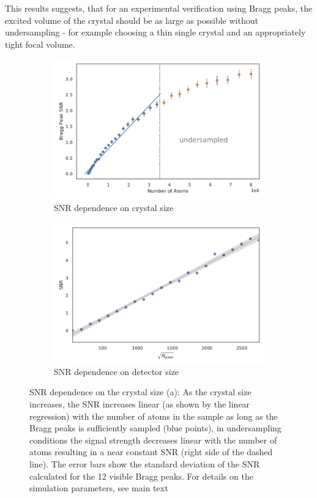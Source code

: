 This results suggests, that for an experimental verification using Bragg peaks, the excited volume of the crystal should be as large as possible without undersampling - for example choosing a thin single crystal and an appropriately tight focal volume.

\begin{figure}
	\centering
	\begin{subfigure}[b]{0.45\textwidth}
		\includegraphics[width=\linewidth]{images/SNRNatoms.pdf}
		\caption{ SNR dependence on crystal size}
		\label{fig:SNRNatoms}
	\end{subfigure}
	\hspace{0.02\textwidth}
	\begin{subfigure}[b]{0.45\textwidth}
		\includegraphics[width=\linewidth]{images/detsize.pdf}
		\caption{SNR dependence on detector size}
		\label{fig:SNRdetsize}
	\end{subfigure}
\caption[SNR dependence on crystal size and detector size]{SNR dependence on the crystal size (a): As the crystal size increases, the SNR increases linear (as shown by the linear regression) with the number of atoms in the sample as long as the Bragg peaks is sufficiently sampled (blue points), in undersampling conditions the signal strength decreases linear with the number of atoms resulting in a near constant SNR (right side of the dashed line). The error bars show the standard deviation of the SNR calculated for the 12 visible Bragg peaks. For details on the simulation parameters, see main text}

\end{figure}


